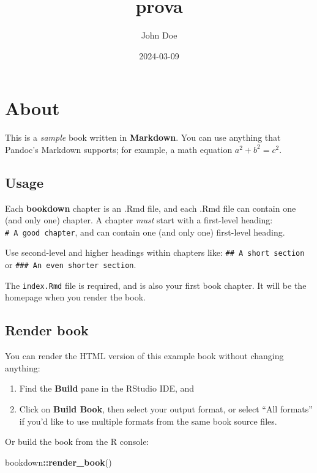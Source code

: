 \documentclass[
]{book}
\title{prova}
\author{John Doe}
\date{2024-03-09}
\newenvironment{Shaded}{\begin{snugshade}}{\end{snugshade}}
\newcommand{\FunctionTok}[1]{\textcolor[rgb]{0.13,0.29,0.53}{\textbf{#1}}}
\newcommand{\NormalTok}[1]{#1}
\newcommand{\SpecialCharTok}[1]{\textcolor[rgb]{0.81,0.36,0.00}{\textbf{#1}}}
\theoremstyle{definition}
\theoremstyle{definition}
\theoremstyle{definition}
\theoremstyle{definition}
\theoremstyle{remark}
\begin{document}
\maketitle

{
\setcounter{tocdepth}{1}
\tableofcontents
}
\hypertarget{about}{%
\chapter{About}\label{about}}

This is a \emph{sample} book written in \textbf{Markdown}. You can use anything that Pandoc's Markdown supports; for example, a math equation \(a^2 + b^2 = c^2\).

\hypertarget{usage}{%
\section{Usage}\label{usage}}

Each \textbf{bookdown} chapter is an .Rmd file, and each .Rmd file can contain one (and only one) chapter. A chapter \emph{must} start with a first-level heading: \texttt{\#\ A\ good\ chapter}, and can contain one (and only one) first-level heading.

Use second-level and higher headings within chapters like: \texttt{\#\#\ A\ short\ section} or \texttt{\#\#\#\ An\ even\ shorter\ section}.

The \texttt{index.Rmd} file is required, and is also your first book chapter. It will be the homepage when you render the book.

\hypertarget{render-book}{%
\section{Render book}\label{render-book}}

You can render the HTML version of this example book without changing anything:

\begin{enumerate}
\def\labelenumi{\arabic{enumi}.}
\item
  Find the \textbf{Build} pane in the RStudio IDE, and
\item
  Click on \textbf{Build Book}, then select your output format, or select ``All formats'' if you'd like to use multiple formats from the same book source files.
\end{enumerate}

Or build the book from the R console:

\begin{Shaded}
\begin{Highlighting}[]
\NormalTok{bookdown}\SpecialCharTok{::}\FunctionTok{render\_book}\NormalTok{()}
\end{Highlighting}
\end{Shaded}
\end{document}
